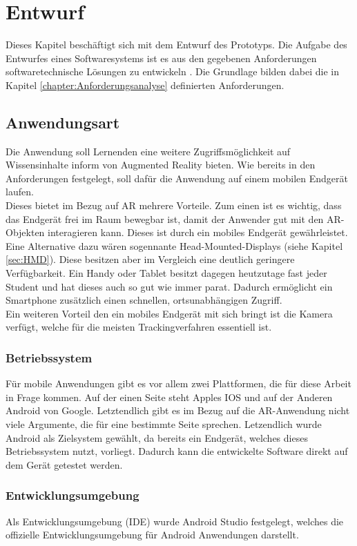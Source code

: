 \chapter{Entwurf}\label{chapter:Entwurf}
Dieses Kapitel beschäftigt sich mit dem Entwurf des Prototyps. Die Aufgabe des Entwurfes eines Softwaresystems ist es aus den gegebenen Anforderungen softwaretechnische Lösungen zu entwickeln \citep{balzert:softwaretechnik}. Die Grundlage bilden dabei die in Kapitel \ref{chapter:Anforderungsanalyse} definierten Anforderungen.

\section{Anwendungsart}
Die Anwendung soll Lernenden eine weitere Zugriffsmöglichkeit auf Wissensinhalte inform von Augmented Reality bieten.
Wie bereits in den Anforderungen festgelegt, soll dafür die Anwendung auf einem mobilen Endgerät laufen.\\
Dieses bietet im Bezug auf AR mehrere Vorteile. Zum einen ist es wichtig, dass das Endgerät frei im Raum bewegbar ist, damit der Anwender gut mit den AR-Objekten interagieren kann. Dieses ist durch ein mobiles Endgerät gewährleistet. Eine Alternative dazu wären sogennante Head-Mounted-Displays (siehe Kapitel \ref{sec:HMD}). Diese besitzen aber im Vergleich eine deutlich geringere Verfügbarkeit. Ein Handy oder Tablet besitzt dagegen heutzutage fast jeder Student und hat dieses auch so gut wie immer parat. Dadurch ermöglicht ein Smartphone zusätzlich einen schnellen, ortsunabhängigen Zugriff. \\
Ein weiteren Vorteil den ein mobiles Endgerät mit sich bringt ist die Kamera verfügt, welche für die meisten Trackingverfahren essentiell ist. \\
\subsection{Betriebssystem}
Für mobile Anwendungen gibt es vor allem zwei Plattformen, die für diese Arbeit in Frage kommen. Auf der einen Seite steht Apples IOS und auf der Anderen Android von Google. Letztendlich gibt es im Bezug auf die AR-Anwendung nicht viele Argumente, die für eine bestimmte Seite sprechen. Letzendlich wurde Android als Zielsystem gewählt, da bereits ein Endgerät, welches dieses Betriebssystem nutzt, vorliegt. Dadurch kann die entwickelte Software direkt auf dem Gerät getestet werden. \\ 
\subsection{Entwicklungsumgebung}
Als Entwicklungsumgebung (IDE) wurde Android Studio festgelegt, welches die offizielle Entwicklungsumgebung für Android Anwendungen darstellt. 


